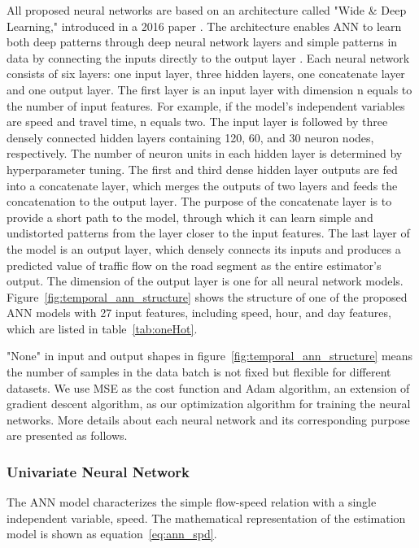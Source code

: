 \documentclass[english]{kththesis}
\begin{document}
All proposed neural networks are based on an architecture called "Wide \& Deep Learning," introduced in a 2016 paper \cite{cheng_w&d_learning}. The architecture enables ANN to learn both deep patterns through deep neural network layers and simple patterns in data by connecting the inputs directly to the output layer \cite{geron_handson_ml, cheng_w&d_learning}. Each neural network consists of six layers: one input layer, three hidden layers, one concatenate layer and one output layer. The first layer is an input layer with dimension n equals to the number of input features. For example, if the model's independent variables are speed and travel time, n equals two. The input layer is followed by three densely connected hidden layers containing 120, 60, and 30 neuron nodes, respectively. The number of neuron units in each hidden layer is determined by hyperparameter tuning. The first and third dense hidden layer outputs are fed into a concatenate layer, which merges the outputs of two layers and feeds the concatenation to the output layer. The purpose of the concatenate layer is to provide a short path to the model, through which it can learn simple and undistorted patterns from the layer closer to the input features. The last layer of the model is an output layer, which densely connects its inputs and produces a predicted value of traffic flow on the road segment as the entire estimator's output. The dimension of the output layer is one for all neural network models. Figure~\ref{fig:temporal_ann_structure} shows the structure of one of the proposed ANN models with 27 input features, including speed, hour, and day features, which are listed in table~\ref{tab:oneHot}.

"None" in input and output shapes in figure~\ref{fig:temporal_ann_structure} means the number of samples in the data batch is not fixed but flexible for different datasets. We use MSE as the cost function and Adam algorithm, an extension of gradient descent algorithm, as our optimization algorithm for training the neural networks. More details about each neural network and its corresponding purpose are presented as follows.

\subsubsection{Univariate Neural Network}
\label{subsubsec:univariateNeuralNetwork}
The ANN model characterizes the simple flow-speed relation with a single independent variable, speed. The mathematical representation of the estimation model is shown as equation~\ref{eq:ann_spd}.
\end{document}
